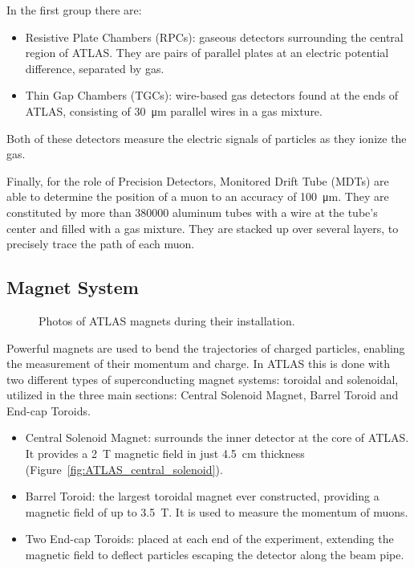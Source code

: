 In the first group there are: 
\begin{itemize}
    \item Resistive Plate Chambers (RPCs): gaseous detectors surrounding the central region of ATLAS. They are pairs of parallel plates at an electric potential difference, separated by gas.
    \item Thin Gap Chambers (TGCs): wire-based gas detectors found at the ends of ATLAS, consisting of \qty{30}{\micro\meter} parallel wires in a gas mixture.
\end{itemize}
Both of these detectors measure the electric signals of particles as they ionize the gas.

Finally, for the role of Precision Detectors, Monitored Drift Tube (MDTs) are able to determine the position of a muon to an accuracy of \qty{100}{\micro\meter}. They are constituted by more than \num{380000} aluminum tubes with a wire at the tube's center and filled with a gas mixture. They are stacked up over several layers, to precisely trace the path of each muon.

\subsection{Magnet System}\label{sec:magnet_system}

\begin{figure}[h!tbp]
    \centering
    \hfill
    \centering
    \caption{Photos of ATLAS magnets during their installation.}
\end{figure}

Powerful magnets are used to bend the trajectories of charged particles, enabling the measurement of their momentum and charge. In ATLAS this is done with two different types of superconducting magnet systems: toroidal and solenoidal, utilized in the three main sections: Central Solenoid Magnet, Barrel Toroid and End-cap Toroids.
\begin{itemize}
    \item Central Solenoid Magnet: surrounds the inner detector at the core of ATLAS. It provides a \qty{2}{\tesla} magnetic field in just \qty{4.5}{\centi\meter} thickness (Figure~\ref{fig:ATLAS_central_solenoid}).
    \item Barrel Toroid: the largest toroidal magnet ever constructed, providing a magnetic field of up to \qty{3.5}{\tesla}. It is used to measure the momentum of muons.
    \item Two End-cap Toroids: placed at each end of the experiment, extending the magnetic field to deflect particles escaping the detector along the beam pipe.
\end{itemize}

